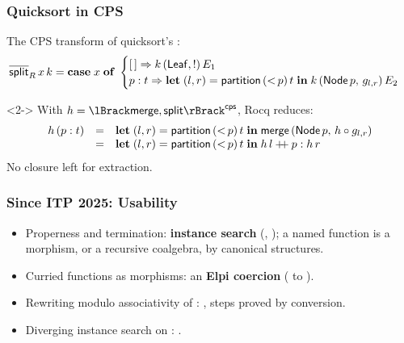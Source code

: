 \begin{frame}[vertical-alignment = top]
  \frametitle{Quicksort in CPS}
  \vspace*{4mm}
  The CPS transform of quicksort's :
  \[
    \overline{\mathsf{split}}_R\,x\,k = \mathbf{case}\;x\;\mathbf{of}\;
    \begin{cases}
      [\,] \Rightarrow k\,(\mathsf{Leaf}, !)\,E_1 \\
      p : t \Rightarrow \mathbf{let}\;(l, r) = \mathsf{partition}\,({<}\,p)\,t
        \;\mathbf{in}\; k\,(\mathsf{Node}\,p,\, g_{l,r})\,E_2
    \end{cases}
  \]
  \begin{uncoverenv}<2->
    With $h = \hylo{\op{merge}}{\op{split}}^{\mathsf{cps}}$, Rocq reduces:
    \[
      \begin{array}{rcl}
        h\,(p : t) & = & \mathbf{let}\;(l, r) = \mathsf{partition}\,({<}\,p)\,t
          \;\mathbf{in}\; \mathsf{merge}\,(\mathsf{Node}\,p,\, h \circ g_{l,r}) \\
        & = & \mathbf{let}\;(l, r) = \mathsf{partition}\,({<}\,p)\,t
          \;\mathbf{in}\; h\,l \mathbin{+\!\!+} p : h\,r
      \end{array}
    \]
    No closure left for extraction.
  \end{uncoverenv}
\end{frame}

\begin{frame}
  \frametitle{Since ITP 2025: Usability}
  \begin{itemize}
    \item<1-> Properness and termination: \textbf{instance search}
      (, ); a named function is a morphism,
      or a recursive coalgebra, by canonical structures.
    \item<2-> Curried functions as morphisms: an \textbf{Elpi coercion}
      ( to ).
    \item<3-> Rewriting modulo associativity of :
      , steps proved by conversion.
    \item<4-> Diverging instance search on : \code{\#[mode
      = "!"]}.
  \end{itemize}
\end{frame}

